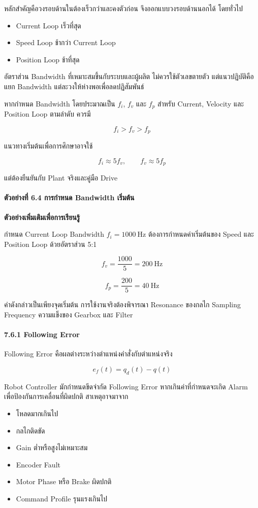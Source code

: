 หลักสำคัญคือวงรอบด้านในต้องเร็วกว่าและคงตัวก่อน จึงออกแบบวงรอบด้านนอกได้ โดยทั่วไป

\begin{itemize}
    \item Current Loop เร็วที่สุด
    \item Speed Loop ช้ากว่า Current Loop
    \item Position Loop ช้าที่สุด
\end{itemize}

อัตราส่วน Bandwidth ที่เหมาะสมขึ้นกับระบบและผู้ผลิต ไม่ควรใช้ตัวเลขตายตัว แต่แนวปฏิบัติคือแยก Bandwidth แต่ละวงให้ห่างพอเพื่อลดปฏิสัมพันธ์

หากกำหนด Bandwidth โดยประมาณเป็น $f_i$, $f_v$ และ $f_p$ สำหรับ Current, Velocity และ Position Loop ตามลำดับ ควรมี

\[
f_i>f_v>f_p
\]

แนวทางเริ่มต้นเพื่อการศึกษาอาจใช้

\[
f_i\approx 5f_v, \qquad f_v\approx 5f_p
\]

แต่ต้องยืนยันกับ Plant จริงและคู่มือ Drive

\paragraph{ตัวอย่างที่ 6.4 การกำหนด Bandwidth เริ่มต้น}

\textbf{ตัวอย่างเพิ่มเติมเพื่อการเรียนรู้}

กำหนด Current Loop Bandwidth $f_i=1000\ \text{Hz}$ ต้องการกำหนดค่าเริ่มต้นของ Speed และ Position Loop ด้วยอัตราส่วน 5:1

\[
f_v=\frac{1000}{5}=200\ \text{Hz}
\]

\[
f_p=\frac{200}{5}=40\ \text{Hz}
\]

ค่าดังกล่าวเป็นเพียงจุดเริ่มต้น การใช้งานจริงต้องพิจารณา Resonance ของกลไก Sampling Frequency ความแข็งของ Gearbox และ Filter

\paragraph{7.6.1 Following Error}

Following Error คือผลต่างระหว่างตำแหน่งคำสั่งกับตำแหน่งจริง

\[
e_f(t)=q_d(t)-q(t)
\]

Robot Controller มักกำหนดขีดจำกัด Following Error หากเกินค่าที่กำหนดจะเกิด Alarm เพื่อป้องกันการเคลื่อนที่ผิดปกติ สาเหตุอาจมาจาก

\begin{itemize}
    \item โหลดมากเกินไป
    \item กลไกติดขัด
    \item Gain ต่ำหรือสูงไม่เหมาะสม
    \item Encoder Fault
    \item Motor Phase หรือ Brake ผิดปกติ
    \item Command Profile รุนแรงเกินไป
\end{itemize}

